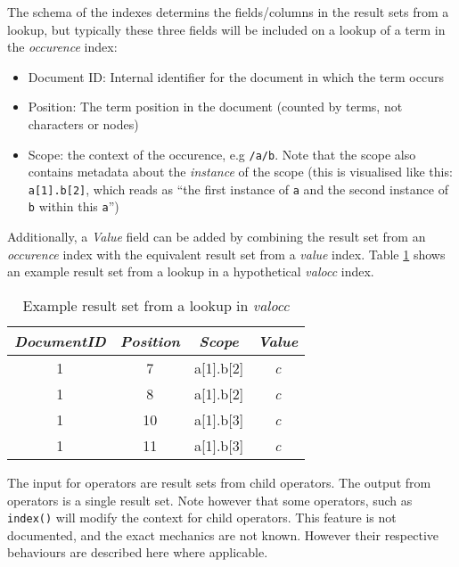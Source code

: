 The schema of the indexes determins the fields/columns in the result sets from
a lookup, but typically these three fields will be included on a lookup of a
term in the \textit{occurence} index:
\begin{itemize}
  \item Document ID: Internal identifier for the document in which the term
  occurs
  \item Position: The term position in the document (counted by terms, not
  characters or nodes)
  \item Scope: the context of the occurence, e.g \texttt{/a/b}. Note that the
  scope also contains metadata about the \textit{instance} of the scope (this
  is visualised like this: \texttt{a[1].b[2]}, which reads as ``the first
  instance of \texttt{a} and the second instance of \texttt{b} within this \texttt{a}'')
\end{itemize}
Additionally, a \textit{Value} field can be added by combining the result set
from an \textit{occurence} index with the equivalent result set from a \textit{value}
index. Table \ref{table:method:mql:example_resultset} shows an example result
set from a lookup in a hypothetical \textit{valocc} index.

\begin{table}[!htp]
\begin{center}

\begin{tabular}{| c | c | c | c |}
\hline
\textit{DocumentID} & \textit{Position} & \textit{Scope} & \textit{Value} \\
\hline
1 & 7 & \textsf{a[1].b[2]} & \emph{c} \\ 
\hline
1 & 8 & \textsf{a[1].b[2]} & \emph{c} \\
\hline
1 & 10 & \textsf{a[1].b[3]} & \emph{c} \\ 
\hline
1 & 11 & \textsf{a[1].b[3]} & \emph{c} \\
\hline
\end{tabular}
\caption{Example result set from a lookup in \textit{valocc}}
\label{table:method:mql:example_resultset}
\end{center}
\end{table}

The input for operators are result sets from child operators. The output from
operators is a single result set. Note however that some operators, such as
\texttt{index()} will modify the context for child operators. This feature is
not documented, and the exact mechanics are not known. However their respective
behaviours are described here where applicable.

